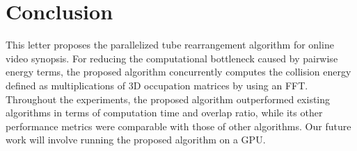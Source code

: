 \documentclass[11pt]{hyu_thesis}
\begin{document}
\chapter{Conclusion}
\label{sec:conc}
This letter proposes the parallelized tube rearrangement algorithm for online video synopsis. For reducing the computational bottleneck caused by pairwise energy terms, the proposed algorithm concurrently computes the collision energy defined as multiplications of 3D occupation matrices by using an FFT. Throughout the experiments, the proposed algorithm outperformed existing algorithms in terms of computation time and overlap ratio, while its other performance metrics were comparable with those of other algorithms. Our future work will involve running the proposed algorithm on a GPU.



\end{document}
